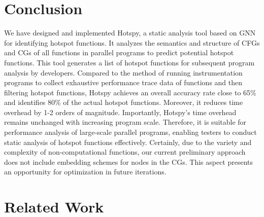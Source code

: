 \documentclass[lineno,sn-mathphys]{sn-jnl}%
\theoremstyle{thmstyleone}%
\theoremstyle{thmstyletwo}%
\theoremstyle{thmstylethree}%
\begin{document}
 \section{Conclusion}
 We have designed and implemented Hotspy, a static analysis tool based on GNN for identifying hotspot functions. It analyzes the semantics and structure of CFGs and CGs of all functions in parallel programs to predict potential hotspot functions. This tool generates a list of hotspot functions for subsequent program analysis by developers. Compared to the method of running instrumentation programs to collect exhaustive performance trace data of functions and then filtering hotspot functions, Hotspy achieves an overall accuracy rate close to 65\% and identifies 80\% of the actual hotspot functions. Moreover, it reduces time overhead by 1-2 orders of magnitude. Importantly, Hotspy's time overhead remains unchanged with increasing program scale. Therefore, it is suitable for performance analysis of large-scale parallel programs, enabling testers to conduct static analysis of hotspot functions effectively.
 Certainly, due to the variety and complexity of non-computational functions, our current preliminary approach does not include embedding schemes for nodes in the CGs. This aspect presents an opportunity for optimization in future iterations.

 \section{Related Work}
\end{document}
